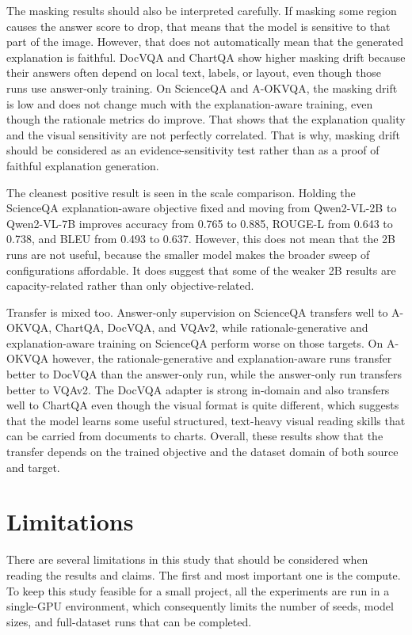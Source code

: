 The masking results should also be interpreted carefully.
If masking some region causes the answer score to drop, that means that the model is sensitive to that part of the image.
However, that does not automatically mean that the generated explanation is faithful.
DocVQA and ChartQA show higher masking drift because their answers often depend on local text, labels, or layout, even though those runs use answer-only training.
On ScienceQA and A-OKVQA, the masking drift is low and does not change much with the explanation-aware training, even though the rationale metrics do improve.
That shows that the explanation quality and the visual sensitivity are not perfectly correlated.
That is why, masking drift should be considered as an evidence-sensitivity test rather than as a proof of faithful explanation generation.

The cleanest positive result is seen in the scale comparison.
Holding the ScienceQA explanation-aware objective fixed and moving from Qwen2-VL-2B to Qwen2-VL-7B improves accuracy from 0.765 to 0.885, ROUGE-L from 0.643 to 0.738, and BLEU from 0.493 to 0.637.
However, this does not mean that the 2B runs are not useful, because the smaller model makes the broader sweep of configurations affordable.
It does suggest that some of the weaker 2B results are capacity-related rather than only objective-related.

Transfer is mixed too.
Answer-only supervision on ScienceQA transfers well to A-OKVQA, ChartQA, DocVQA, and VQAv2, while rationale-generative and explanation-aware training on ScienceQA perform worse on those targets.
On A-OKVQA however, the rationale-generative and explanation-aware runs transfer better to DocVQA than the answer-only run, while the answer-only run transfers better to VQAv2.
The DocVQA adapter is strong in-domain and also transfers well to ChartQA even though the visual format is quite different, which suggests that the model learns some useful structured, text-heavy visual reading skills that can be carried from documents to charts.
Overall, these results show that the transfer depends on the trained objective and the dataset domain of both source and target.

\section{Limitations}
There are several limitations in this study that should be considered when reading the results and claims.
The first and most important one is the compute.
To keep this study feasible for a small project, all the experiments are run in a single-GPU environment, which consequently limits the number of seeds, model sizes, and full-dataset runs that can be completed.

